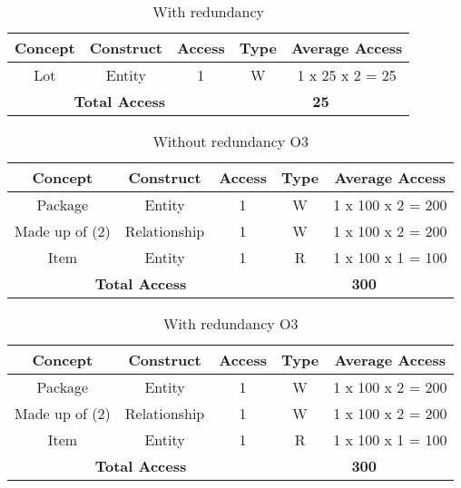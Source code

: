 \begin{table}[!h]\caption{With redundancy}
	\begin{center}
		\begin{tabular}{| c | c | c | c | c |}
			\hline
			\textbf{Concept} & \textbf{Construct} & \textbf{Access} & \textbf{Type} & \textbf{Average Access} \\ \hline
			Lot & Entity & 1 & W & 1 x 25 x 2 = 25 \\ \hline
			\multicolumn{3}{|c|}{\textbf{Total Access}} & \multicolumn{2}{|c|}{\textbf{25}} \\ \hline
		\end{tabular}
	\end{center}
\end{table}



\begin{table}[!h]\caption{Without redundancy O3}
	\begin{center}
		\begin{tabular}{| c | c | c | c | c |}
			\hline
			\textbf{Concept} & \textbf{Construct} & \textbf{Access} & \textbf{Type} & \textbf{Average Access} \\ \hline
			Package & Entity & 1 & W & 1 x 100 x 2 = 200 \\ \hline
			Made up of (2) & Relationship & 1 & W & 1 x 100 x 2 = 200 \\ \hline		Item & Entity & 1 & R & 1 x 100 x 1 = 100 \\ \hline		
			\multicolumn{3}{|c|}{\textbf{Total Access}} & \multicolumn{2}{|c|}{\textbf{300}} \\ \hline
		\end{tabular}
	\end{center}
\end{table}

\begin{table}[!h]\caption{With redundancy O3}
	\begin{center}
		\begin{tabular}{| c | c | c | c | c |}
			\hline
			\textbf{Concept} & \textbf{Construct} & \textbf{Access} & \textbf{Type} & \textbf{Average Access} \\ \hline
			Package & Entity & 1 & W & 1 x 100 x 2 = 200 \\ \hline
			Made up of (2) & Relationship & 1 & W & 1 x 100 x 2 = 200 \\ \hline		Item & Entity & 1 & R & 1 x 100 x 1 = 100 \\ \hline		
			\multicolumn{3}{|c|}{\textbf{Total Access}} & \multicolumn{2}{|c|}{\textbf{300}} \\ \hline
		\end{tabular}
	\end{center}
\end{table}

